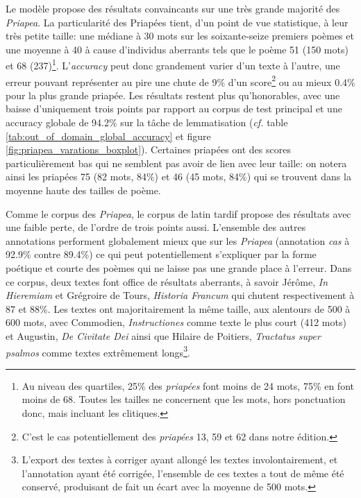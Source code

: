 Le modèle propose des résultats convaincants sur une très grande majorité des \textit{Priapea}. La particularité des Priapées tient, d'un point de vue statistique, à leur très petite taille: une médiane à 30 mots sur les soixante-seize premiers poèmes et une moyenne à 40 à cause d'individus aberrants tels que le poème 51 (150 mots) et 68 (237)\footnote{Au niveau des quartiles, 25\% des \textit{priapées} font moins de 24 mots, 75\% en font moins de 68. Toutes les tailles ne concernent que les mots, hors ponctuation donc, mais incluant les clitiques.}. L'\textit{accuracy} peut donc grandement varier d'un texte à l'autre, une erreur pouvant représenter au pire une chute de 9\% d'un score\footnote{C'est le cas potentiellement des \textit{priapées} 13, 59 et 62 dans notre édition.} ou au mieux 0.4\% pour la plus grande priapée. Les résultats restent plus qu'honorables, avec une baisse d'uniquement trois points par rapport au corpus de test principal et une accuracy globale de 94.2\% sur la tâche de lemmatisation (\textit{cf.} table \ref{tab:out_of_domain_global_accuracy} et figure \ref{fig:priapea_varations_boxplot}). Certaines priapées ont des scores particulièrement bas qui ne semblent pas avoir de lien avec leur taille: on notera ainsi les priapées 75 (82 mots, 84\%) et 46 (45 mots, 84\%) qui se trouvent dans la moyenne haute des tailles de poème.

Comme le corpus des \textit{Priapea}, le corpus de latin tardif propose des résultats avec une faible perte, de l'ordre de trois points aussi. L'ensemble des autres annotations performent globalement mieux que sur les \textit{Priapea} (annotation \textit{cas} à 92.9\% contre 89.4\%) ce qui peut potentiellement s'expliquer par la forme poétique et courte des poèmes qui ne laisse pas une grande place à l'erreur. Dans ce corpus, deux textes font office de résultats aberrants, à savoir Jérôme, \textit{In Hieremiam} et Grégroire de Tours, \textit{Historia Francum} qui chutent respectivement à 87 et 88\%. Les textes ont majoritairement la même taille, aux alentours de 500 à 600 mots, avec Commodien, \textit{Instructiones} comme texte le plus court (412 mots) et Augustin, \textit{De Civitate Dei} ainsi que Hilaire de Poitiers, \textit{Tractatus super psalmos} comme textes extrêmement longs\footnote{L'export des textes à corriger ayant allongé les textes involontairement, et l'annotation ayant été corrigée, l'ensemble de ces textes a tout de même été conservé, produisant de fait un écart avec la moyenne de 500 mots.}.

